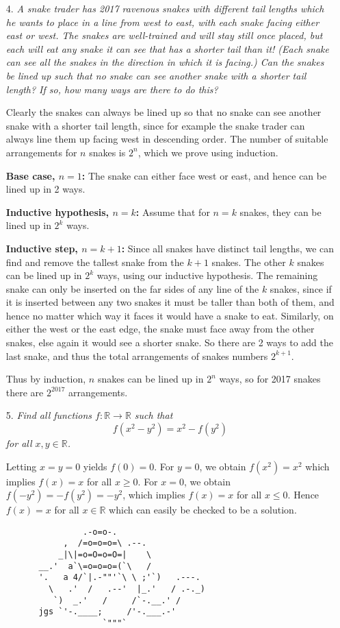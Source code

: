 \documentclass[12pt]{article}
\begin{document}
\begin{enumerate}
\item[4.] \emph{A snake trader has 2017 ravenous snakes with different tail lengths which he wants to place in a line from west to east, with each snake facing either east or west. The snakes are well-trained and will stay still once placed, but each will eat any snake it can see that has a shorter tail than it! (Each snake can see all the snakes in the direction in which it is facing.) Can the snakes be lined up such that no snake can see another snake with a shorter tail length? If so, how many ways are there to do this?}

Clearly the snakes can always be lined up so that no snake can see another snake with a shorter tail length, since for example the snake trader can always line them up facing west in descending order. The number of suitable arrangements for $n$ snakes is $2^n$, which we prove using induction.

\textbf{Base case, $n =1$:} The snake can either face west or east, and hence can be lined up in 2 ways.

\textbf{Inductive hypothesis, $n=k$:} Assume that for $n=k$ snakes, they can be lined up in $2^k$ ways.

\textbf{Inductive step, $n=k+1$:} Since all snakes have distinct tail lengths, we can find and remove the tallest snake from the $k+1$ snakes. The other $k$ snakes can be lined up in $2^k$ ways, using our inductive hypothesis. The remaining snake can only be inserted on the far sides of any line of the $k$ snakes, since if it is inserted between any two snakes it must be taller than both of them, and hence no matter which way it faces it would have a snake to eat. Similarly, on either the west or the east edge, the snake must face away from the other snakes, else again it would see a shorter snake. So there are 2 ways to add the last snake, and thus the total arrangements of snakes numbers $2^{k+1}$.

Thus by induction, $n$ snakes can be lined up in $2^n$ ways, so for 2017 snakes there are $2^{2017}$ arrangements.


\item[5.] \emph{Find all functions $f : \mathbb{R} \to \mathbb{R}$ such that
	\[f(x^2-y^2) = x^2 - f(y^2)\]
for all $x,y \in \mathbb{R}$.}

Letting $x = y = 0$ yields $f(0) = 0$. For $y = 0$, we obtain $f(x^2) = x^2$ which implies $f(x) = x$ for all $x \geq 0$. For $x = 0$, we obtain $f(-y^2) = -f(y^2) = -y^2$, which implies $f(x) = x$ for all $x \leq 0$. Hence $f(x) = x$ for all $x \in \mathbb{R}$ which can easily be checked to be a solution.

\end{enumerate}

\begin{center} \begin{verbatim}
                   .-o=o-.
               ,  /=o=o=o=\ .--.
              _|\|=o=O=o=O=|    \
          __.'  a`\=o=o=o=(`\   /
          '.   a 4/`|.-""'`\ \ ;'`)   .---.
            \   .'  /   .--'  |_.'   / .-._)
             `)  _.'   /     /`-.__.' /
          jgs `'-.____;     /'-.___.-'
                       `"""`
\end{verbatim} \end{center}
\end{document}
